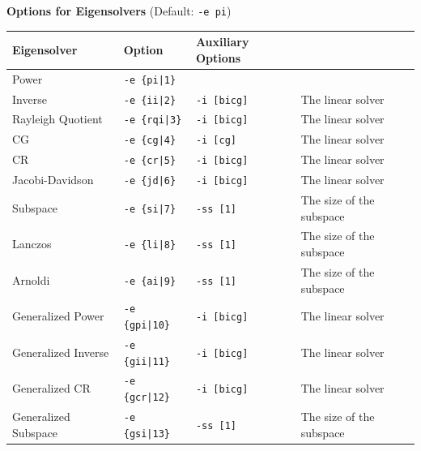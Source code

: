 \documentclass[a4paper]{article}
\begin{document}
\begin{minipage}[t]{\textwidth}
\begin{center}
{\bf Options for Eigensolvers} (Default: \verb=-e pi=) \\
\begin{tabular}{l|lll}\hline\hline
 Eigensolver      & Option              &  Auxiliary Options  & \\ \hline
\hline
 Power                             & \verb=-e {pi|1}=        &    \\ 
 Inverse                           & \verb=-e {ii|2}=        &
 \verb=-i [bicg]= & The linear solver \\
 Rayleigh Quotient                 & \verb=-e {rqi|3}=       &
 \verb=-i [bicg]= & The linear solver \\
 CG                                & \verb=-e {cg|4}=        &
 \verb=-i [cg]= & The linear solver \\ 
 CR                                & \verb=-e {cr|5}=        &
 \verb=-i [bicg]= & The linear solver \\ 
 Jacobi-Davidson                   & \verb=-e {jd|6}=        &
 \verb=-i [bicg]= & The linear solver \\ 
 Subspace                          & \verb=-e {si|7}=        &
 \verb=-ss [1]= & The size of the subspace \\
 Lanczos                           & \verb=-e {li|8}=        &
 \verb=-ss [1]= & The size of the subspace \\
 Arnoldi                           & \verb=-e {ai|9}=        &
 \verb=-ss [1]= & The size of the subspace \\
 Generalized Power                 & \verb=-e {gpi|10}=      &
 \verb=-i [bicg]= & The linear solver \\ 
 Generalized Inverse               & \verb=-e {gii|11}=      & 
 \verb=-i [bicg]= & The linear solver \\
 Generalized CR                    & \verb=-e {gcr|12}=      & 
 \verb=-i [bicg]= & The linear solver \\
 Generalized Subspace              & \verb=-e {gsi|13}=      &
 \verb=-ss [1]= & The size of the subspace \\
\hline         
\end{tabular}
\end{center}
\end{minipage}
\\ \\
\end{document}
